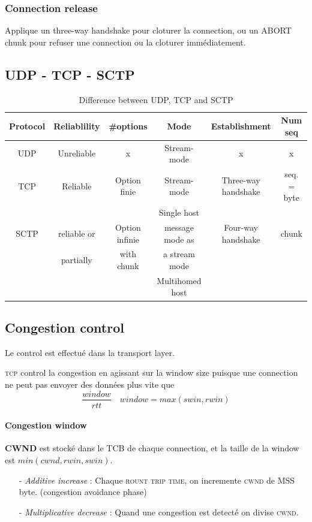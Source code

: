 \subsubsection{Connection release}
Applique un three-way handshake pour cloturer la connection, ou un ABORT chunk
pour refuser une connection ou la cloturer immédiatement.

\subsection{UDP - TCP - SCTP}
\begin{table}[h]
    \begin{tabular}{|c|c|c|c|c|c|}
    	   \hline
    	    Protocol& Reliablility&\#options&Mode&Establishment&Num seq\\
        \hline
        UDP & Unreliable   & x              & Stream-mode     & x                   & x \\
        \hline
        TCP & Reliable     & Option finie   & Stream-mode     & Three-way handshake & seq. = byte \\
            &              &                &  Single host    &                     &  \\
        \hline
        SCTP & reliable or & Option infinie & message mode as & Four-way handshake & chunk \\
             & partially   & with chunk     & a stream mode   &                    & \\
             &             &                & Multihomed host &                    & \\
        \hline
    \end{tabular}
    \caption{Difference between UDP, TCP and SCTP}
\end{table}
\subsection{Congestion control}
Le control est effectué dans la transport layer.

\textsc{tcp} control la congestion en agissant sur la window size puisque une connection
ne peut pas envoyer des données plus vite que  $$\frac{window}{rtt}\quad window=max(swin,rwin)$$

\paragraph{Congestion window}
\textbf{CWND} est stocké dans le \textsc{TCB} de chaque connection, et la taille de la window
est $min(cwnd, rwin, swin)$.  
\begin{itemize}
    \item[-] \textit{Additive increase} : Chaque \textsc{rount trip time}, on incremente \textsc{cwnd} de MSS byte. (congestion avoidance phase)
    \item[-] \textit{Multiplicative decrease} : Quand une congestion
est detecté on divise \textsc{cwnd}.
\end{itemize}

